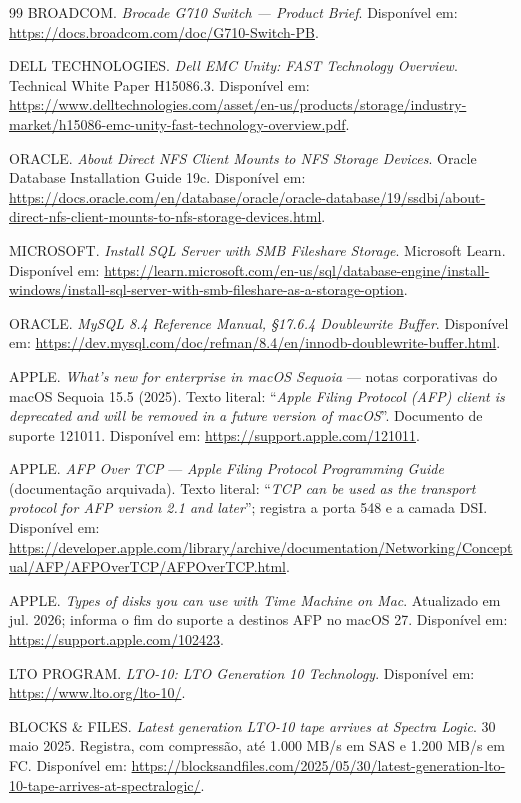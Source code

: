 \documentclass[11pt,a4paper]{article}
\begin{document}
\begin{thebibliography}{99}
 BROADCOM. \textit{Brocade G710 Switch --- Product Brief}. Disponível em:
\url{https://docs.broadcom.com/doc/G710-Switch-PB}.

 DELL TECHNOLOGIES. \textit{Dell EMC Unity: FAST Technology Overview}. Technical
White Paper H15086.3. Disponível em:
\url{https://www.delltechnologies.com/asset/en-us/products/storage/industry-market/h15086-emc-unity-fast-technology-overview.pdf}.

 ORACLE. \textit{About Direct NFS Client Mounts to NFS Storage Devices}. Oracle
Database Installation Guide 19c. Disponível em:
\url{https://docs.oracle.com/en/database/oracle/oracle-database/19/ssdbi/about-direct-nfs-client-mounts-to-nfs-storage-devices.html}.

 MICROSOFT. \textit{Install SQL Server with SMB Fileshare Storage}. Microsoft
Learn. Disponível em:
\url{https://learn.microsoft.com/en-us/sql/database-engine/install-windows/install-sql-server-with-smb-fileshare-as-a-storage-option}.

 ORACLE. \textit{MySQL 8.4 Reference Manual, §17.6.4 Doublewrite Buffer}.
Disponível em: \url{https://dev.mysql.com/doc/refman/8.4/en/innodb-doublewrite-buffer.html}.

 APPLE. \textit{What's new for enterprise in macOS Sequoia} --- notas
corporativas do macOS Sequoia 15.5 (2025). Texto literal: ``\textit{Apple Filing Protocol (AFP)
client is deprecated and will be removed in a future version of macOS}''. Documento de suporte
121011. Disponível em: \url{https://support.apple.com/121011}.

 APPLE. \textit{AFP Over TCP} --- \textit{Apple Filing Protocol Programming
Guide} (documentação arquivada). Texto literal: ``\textit{TCP can be used as the transport protocol
for AFP version 2.1 and later}''; registra a porta 548 e a camada DSI. Disponível em:
\url{https://developer.apple.com/library/archive/documentation/Networking/Conceptual/AFP/AFPOverTCP/AFPOverTCP.html}.

 APPLE. \textit{Types of disks you can use with Time Machine on Mac}.
Atualizado em jul. 2026; informa o fim do suporte a destinos AFP no macOS 27.
Disponível em: \url{https://support.apple.com/102423}.

 LTO PROGRAM. \textit{LTO-10: LTO Generation 10 Technology}. Disponível em:
\url{https://www.lto.org/lto-10/}.

 BLOCKS \& FILES. \textit{Latest generation LTO-10 tape arrives at Spectra
Logic}. 30 maio 2025. Registra, com compressão, até 1.000 MB/s em SAS e 1.200 MB/s em FC. Disponível em:
\url{https://blocksandfiles.com/2025/05/30/latest-generation-lto-10-tape-arrives-at-spectralogic/}.


\end{thebibliography}
\end{document}
